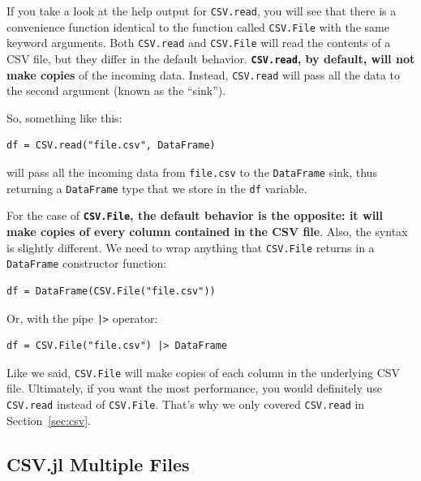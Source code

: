 \documentclass[
  notoc %
]{tufte-book}
\newcommand{\passthrough}[1]{#1}
\begin{document}
If you take a look at the help output for
\passthrough{\lstinline!CSV.read!}, you will see that there is a
convenience function identical to the function called
\passthrough{\lstinline!CSV.File!} with the same keyword arguments. Both
\passthrough{\lstinline!CSV.read!} and
\passthrough{\lstinline!CSV.File!} will read the contents of a CSV file,
but they differ in the default behavior.
\textbf{\passthrough{\lstinline!CSV.read!}, by default, will not make
copies} of the incoming data. Instead,
\passthrough{\lstinline!CSV.read!} will pass all the data to the second
argument (known as the ``sink'').

So, something like this:

\begin{lstlisting}
df = CSV.read("file.csv", DataFrame)
\end{lstlisting}

will pass all the incoming data from \passthrough{\lstinline!file.csv!}
to the \passthrough{\lstinline!DataFrame!} sink, thus returning a
\passthrough{\lstinline!DataFrame!} type that we store in the
\passthrough{\lstinline!df!} variable.

For the case of \textbf{\passthrough{\lstinline!CSV.File!}, the default
behavior is the opposite: it will make copies of every column contained
in the CSV file}. Also, the syntax is slightly different. We need to
wrap anything that \passthrough{\lstinline!CSV.File!} returns in a
\passthrough{\lstinline!DataFrame!} constructor function:

\begin{lstlisting}
df = DataFrame(CSV.File("file.csv"))
\end{lstlisting}

Or, with the pipe \passthrough{\lstinline!|>!} operator:

\begin{lstlisting}
df = CSV.File("file.csv") |> DataFrame
\end{lstlisting}

Like we said, \passthrough{\lstinline!CSV.File!} will make copies of
each column in the underlying CSV file. Ultimately, if you want the most
performance, you would definitely use \passthrough{\lstinline!CSV.read!}
instead of \passthrough{\lstinline!CSV.File!}. That's why we only
covered \passthrough{\lstinline!CSV.read!} in Section~\ref{sec:csv}.

\hypertarget{sec:df_performance_csv_multiple}{%
\subsection{CSV.jl Multiple
Files}\label{sec:df_performance_csv_multiple}}
\end{document}
